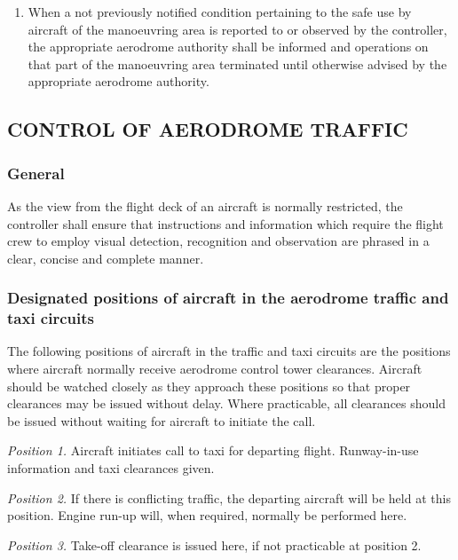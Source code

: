 \documentclass[../main.tex]{subfiles}
\begin{document}
\begin{enumerate}[label=\arabic{section}.\arabic{subsection}.\arabic*]

        \item When a not previously notified condition pertaining to the safe use by aircraft of the manoeuvring area is reported to or observed by the controller, the appropriate aerodrome authority shall be informed and operations on that part of the manoeuvring area terminated until otherwise advised by the appropriate aerodrome authority.
    \end{enumerate}

    \subsection[Control of aerodrome traffic]{CONTROL OF AERODROME TRAFFIC}

    \subsubsection{General}

    As the view from the flight deck of an aircraft is normally restricted, the controller shall ensure that instructions and information which require the flight crew to employ visual detection, recognition and observation are phrased in a clear, concise and complete manner.

    \subsubsection{Designated positions of aircraft in the aerodrome traffic and taxi circuits} \label{7.6.2}

    The following positions of aircraft in the traffic and taxi circuits are the positions where aircraft normally receive aerodrome control tower clearances. Aircraft should be watched closely as they approach these positions so that proper clearances may be issued without delay. Where practicable, all clearances should be issued without waiting for aircraft to initiate the call.

    \textit{Position 1.} Aircraft initiates call to taxi for departing flight. Runway-in-use information and taxi clearances given.

    \textit{Position 2.} If there is conflicting traffic, the departing aircraft will be held at this position. Engine run-up will, when required, normally be performed here.

    \textit{Position 3.} Take-off clearance is issued here, if not practicable at position 2.
\end{document}
